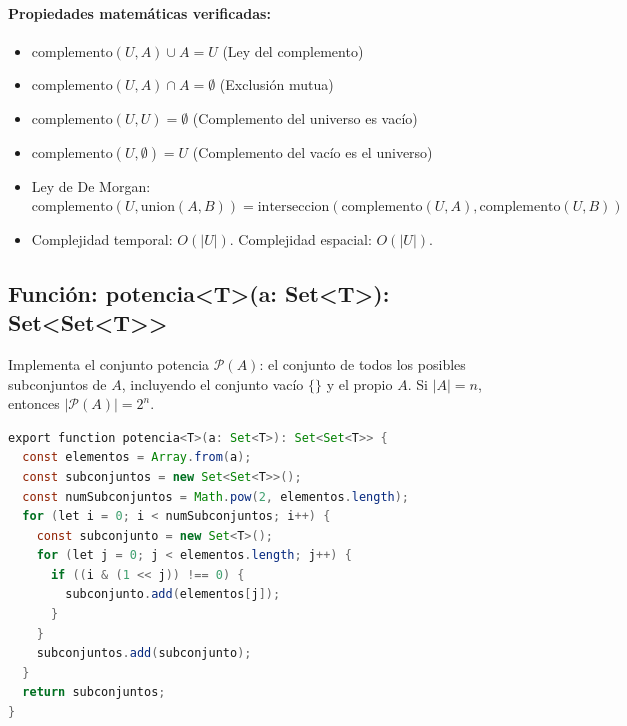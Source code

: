 \documentclass[11pt,a4paper]{article}
\begin{document}
\paragraph{Propiedades matemáticas verificadas:}
\begin{itemize}[noitemsep]
    \item $\text{complemento}(U, A) \cup A = U$ (Ley del complemento)
    \item $\text{complemento}(U, A) \cap A = \emptyset$ (Exclusión mutua)
    \item $\text{complemento}(U, U) = \emptyset$ (Complemento del universo es vacío)
    \item $\text{complemento}(U, \emptyset) = U$ (Complemento del vacío es el universo)
    \item Ley de De Morgan: $\text{complemento}(U, \text{union}(A,B)) = \text{interseccion}(\text{complemento}(U,A), \text{complemento}(U,B))$
    \item Complejidad temporal: $O(|U|)$. Complejidad espacial: $O(|U|)$.
\end{itemize}

\subsection{Función: potencia\textless{}T\textgreater{}(a: Set\textless{}T\textgreater{}): Set\textless{}Set\textless{}T\textgreater{}\textgreater{}}
Implementa el conjunto potencia $\mathcal{P}(A)$: el conjunto de todos los posibles subconjuntos de $A$, incluyendo el conjunto vacío $\{\}$ y el propio $A$. Si $|A| = n$, entonces $|\mathcal{P}(A)| = 2^n$.

\begin{lstlisting}[language=Java, caption={operations.ts - función potencia (algoritmo de máscara de bits)}]
export function potencia<T>(a: Set<T>): Set<Set<T>> {
  const elementos = Array.from(a);
  const subconjuntos = new Set<Set<T>>();
  const numSubconjuntos = Math.pow(2, elementos.length);
  for (let i = 0; i < numSubconjuntos; i++) {
    const subconjunto = new Set<T>();
    for (let j = 0; j < elementos.length; j++) {
      if ((i & (1 << j)) !== 0) {
        subconjunto.add(elementos[j]);
      }
    }
    subconjuntos.add(subconjunto);
  }
  return subconjuntos;
}
\end{lstlisting}
\end{document}
